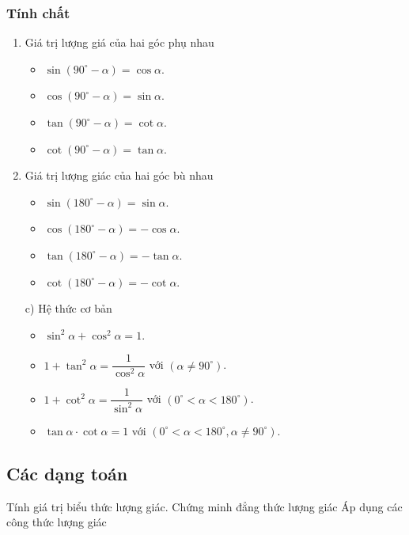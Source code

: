 \subsubsection{Tính chất}
\begin{multicols}{2}
\begin{enumerate}
	\item Giá trị lượng giá của hai góc phụ nhau
	\begin{itemize}
		\item $\sin(90^\circ-\alpha)=\cos\alpha$.
		\item $\cos(90^\circ-\alpha)=\sin\alpha$.
		\item $\tan(90^\circ-\alpha)=\cot\alpha$.
		\item $\cot(90^\circ-\alpha)=\tan\alpha$.
	\end{itemize}
	\item Giá trị lượng giác của hai góc bù nhau
	\begin{itemize}
		\item $\sin(180^\circ-\alpha)=\sin\alpha$.
		\item $\cos(180^\circ-\alpha)=-\cos\alpha$.
		\item $\tan(180^\circ-\alpha)=-\tan\alpha$.
		\item $\cot(180^\circ-\alpha)=-\cot\alpha$.
	\end{itemize}
\end{enumerate}
\end{multicols}
\begin{enumerate}
\item[c)] Hệ thức cơ bản
	\begin{itemize}
		\item $\sin^2\alpha+\cos^2\alpha=1$.
		\item $1+\tan^2\alpha=\dfrac{1}{\cos^2\alpha}$ với $(\alpha\ne 90^\circ)$.
		\item $1+\cot^2\alpha=\dfrac{1}{\sin^2\alpha}$ với $(0^\circ<\alpha< 180^\circ)$.
		\item $\tan\alpha\cdot\cot\alpha=1$ với $(0^\circ<\alpha< 180^\circ, \alpha\ne 90^\circ)$.
	\end{itemize}
\end{enumerate}
\subsection{Các dạng toán}
\begin{dang}{Tính giá trị biểu thức lượng giác. Chứng minh đẳng thức lượng giác}
	Áp dụng các công thức lượng giác
\end{dang}

